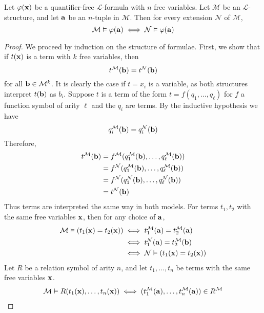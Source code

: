 \begin{proposition}
    Let \( \varphi(\vb x) \) be a quantifier-free \( \mathcal L \)-formula with \( n \) free variables.
    Let \( \mathcal M \) be an \( \mathcal L \)-structure, and let \( \vb a \) be an \( n \)-tuple in \( \mathcal M \).
    Then for every extension \( \mathcal N \) of \( \mathcal M \),
    \[ \mathcal M \vDash \varphi(\vb a) \iff \mathcal N \vDash \varphi(\vb a) \]
\end{proposition}
\begin{proof}
    We proceed by induction on the structure of formulae.
    First, we show that if \( t(\vb x) \) is a term with \( k \) free variables, then
    \[ t^{\mathcal M}(\vb b) = t^{\mathcal N}(\vb b) \]
    for all \( \vb b \in \mathcal M^k \).
    It is clearly the case if \( t = x_i \) is a variable, as both structures interpret \( t(\vb b) \) as \( b_i \).
    Suppose \( t \) is a term of the form \( t = f(q_1, \dots, q_\ell) \) for \( f \) a function symbol of arity \( \ell \) and the \( q_i \) are terms.
    By the inductive hypothesis we have
    \[ q_i^{\mathcal M}(\vb b) = q_i^{\mathcal N}(\vb b) \]
    Therefore,
    \begin{align*}
        t^{\mathcal M}(\vb b) &= f^{\mathcal M}(q_1^{\mathcal M}(\vb b), \dots, q_\ell^{\mathcal M}(\vb b)) \\
        &= f^{\mathcal N}(q_1^{\mathcal M}(\vb b), \dots, q_\ell^{\mathcal M}(\vb b)) \\
        &= f^{\mathcal N}(q_1^{\mathcal N}(\vb b), \dots, q_\ell^{\mathcal N}(\vb b)) \\
        &= t^{\mathcal N}(\vb b)
    \end{align*}
    Thus terms are interpreted the same way in both models.
    For terms \( t_1, t_2 \) with the same free variables \( \vb x \), then for any choice of \( \vb a \),
    \begin{align*}
        \mathcal M \vDash (t_1(\vb x) = t_2(\vb x)) &\iff t_1^{\mathcal M}(\vb a) = t_2^{\mathcal M}(\vb a) \\
        &\iff t_1^{\mathcal N}(\vb a) = t_2^{\mathcal M}(\vb b) \\
        &\iff \mathcal N \vDash (t_1(\vb x) = t_2(\vb x))
    \end{align*}
    Let \( R \) be a relation symbol of arity \( n \), and let \( t_1, \dots, t_n \) be terms with the same free variables \( \vb x \).
    \begin{align*}
        \mathcal M \vDash R(t_1(\vb x), \dots, t_n(\vb x)) &\iff (t_1^{\mathcal M}(\vb a), \dots, t_n^{\mathcal M}(\vb a)) \in R^{\mathcal M} \\

\end{align*}
\end{proof}
